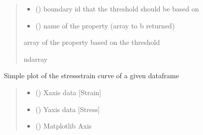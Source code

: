 \documentclass[letterpaper,10pt,english]{sphinxmanual}
\begin{document}
\begin{fulllineitems}
\begin{fulllineitems}
\begin{quote}
\begin{description}
\begin{itemize}
\item {} 
\sphinxAtStartPar
{} () \textendash{} boundary id that the threshold should be based on

\item {} 
\sphinxAtStartPar
{} () \textendash{} name of the property (array to b returned)

\end{itemize}

\sphinxAtStartPar
array of the property based on the threshold

\sphinxAtStartPar
ndarray

\end{description}\end{quote}

\end{fulllineitems}


\begin{fulllineitems}
\label{\detokenize{pyfdempp:pyfdempp.pyfdempp.Model.plot_stress_strain}}
\pysigstartsignatures
{}
\pysigstopsignatures
\sphinxAtStartPar
Simple plot of the stress\sphinxhyphen{}strain curve of a given dataframe
\begin{quote}\begin{description}
\begin{itemize}
\item {} 
\sphinxAtStartPar
{} () \textendash{} X\sphinxhyphen{}axis data {[}Strain{]}

\item {} 
\sphinxAtStartPar
{} () \textendash{} Y\sphinxhyphen{}axis data {[}Stress{]}

\item {} 
\sphinxAtStartPar
{} () \textendash{} Matplotlib Axis


\end{itemize}
\end{description}
\end{quote}
\end{fulllineitems}
\end{fulllineitems}
\end{document}

